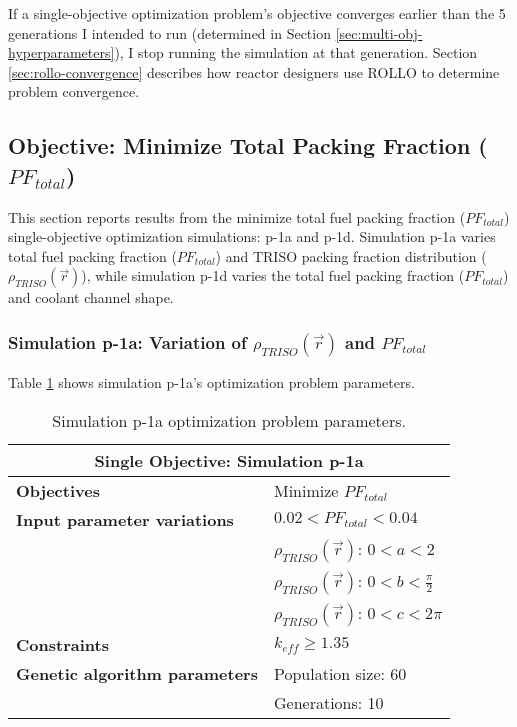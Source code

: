 If a single-objective optimization problem's objective converges earlier than the 
5 generations I intended to run (determined in Section 
\ref{sec:multi-obj-hyperparameters}), I stop running the simulation at that generation.
Section \ref{sec:rollo-convergence} describes how reactor designers use 
\gls{ROLLO} to determine problem convergence. 

\subsection{Objective: Minimize Total Packing Fraction ($PF_{total}$)}
\label{sec:plank-1-obj-pf}
This section reports results from the minimize total fuel packing fraction 
($PF_{total}$) single-objective optimization simulations: p-1a and p-1d. 
Simulation p-1a varies total fuel packing fraction ($PF_{total}$) and \gls{TRISO} 
packing fraction distribution ($\rho_{TRISO}(\vec{r})$), while simulation p-1d varies 
the total fuel packing fraction ($PF_{total}$) and coolant channel shape. 

\subsubsection{Simulation p-1a: Variation of $\rho_{TRISO}(\vec{r})$ and $PF_{total}$}
Table \ref{tab:simulationp1a} shows simulation p-1a's optimization problem parameters. 
\begin{table}[htbp!]
    \centering
    \onehalfspacing
    \caption{Simulation p-1a optimization problem parameters.}
	\label{tab:simulationp1a}
    \footnotesize
    \begin{tabular}{l|p{5cm}}
    \hline 
    \multicolumn{2}{c}{\textbf{Single Objective: Simulation p-1a}} \\
    \hline 
    \textbf{Objectives} & Minimize $PF_{total}$ \\
    \hline 
    \textbf{Input parameter variations} & $0.02<PF_{total}<0.04$ \\
    & $\rho_{TRISO}(\vec{r})$: $0<a<2$ \\
    & $\rho_{TRISO}(\vec{r})$: $0<b<\frac{\pi}{2}$ \\
    & $\rho_{TRISO}(\vec{r})$: $0<c<2\pi$ \\
    \hline
    \textbf{Constraints} & $k_{eff} \geq 1.35$\\ 
    \hline 
    \textbf{Genetic algorithm parameters} & Population size: 60 \\
    & Generations: 10 \\
    \hline
    \end{tabular}
\end{table}

